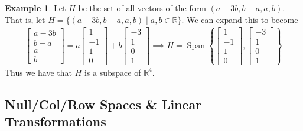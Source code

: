 \documentclass{article}
\numberwithin{equation}{section}
\theoremstyle{definition}
\newtheorem{ex}[thm]{Example}
\newcommand{\R}{\mathbb{R}}
\DeclareMathOperator{\spa}{Span}
\theoremstyle{adefn}
\begin{document}
	\begin{ex}
		Let $H$ be the set of all vectors of the form $(a-3b, b-a, a, b)$. That is, let $H = \{(a-3b, b-a, a, b) \mid a, b \in \R\}$. We can expand this to become 
		\begin{align*}
			\begin{bmatrix}a-3b\\b-a\\a\\b\end{bmatrix} = a\begin{bmatrix}1\\-1\\1\\0\end{bmatrix} + b\begin{bmatrix}-3\\1\\0\\1\end{bmatrix} \implies 
			H = \spa\left\{ \begin{bmatrix}1\\-1\\1\\0\end{bmatrix}, \begin{bmatrix}-3\\1\\0\\1\end{bmatrix}\right\}
		\end{align*}
		Thus we have that $H$ is a subspace of $\R^4$. 
	\end{ex}
	
	\subsection{Null/Col/Row Spaces \& Linear Transformations}
\end{document}
